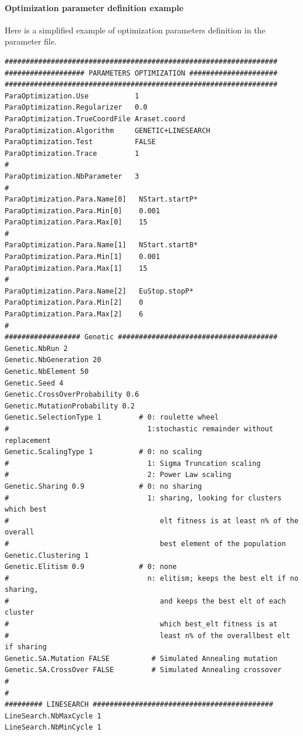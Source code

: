 \documentclass[a4paper,titlepage]{report}
\begin{document}
\paragraph{Optimization parameter definition example}
Here is a simplified example of optimization parameters definition in the parameter file. 
{\scriptsize \begin{verbatim}
#################################################################
################### PARAMETERS OPTIMIZATION #####################
#################################################################
ParaOptimization.Use           1
ParaOptimization.Regularizer   0.0
ParaOptimization.TrueCoordFile Araset.coord
ParaOptimization.Algorithm     GENETIC+LINESEARCH
ParaOptimization.Test          FALSE
ParaOptimization.Trace         1
#
ParaOptimization.NbParameter   3
#
ParaOptimization.Para.Name[0]   NStart.startP*
ParaOptimization.Para.Min[0]    0.001
ParaOptimization.Para.Max[0]    15      
#
ParaOptimization.Para.Name[1]   NStart.startB*
ParaOptimization.Para.Min[1]    0.001
ParaOptimization.Para.Max[1]    15      
#
ParaOptimization.Para.Name[2]   EuStop.stopP*
ParaOptimization.Para.Min[2]    0
ParaOptimization.Para.Max[2]    6       
#
################## Genetic ######################################
Genetic.NbRun 2
Genetic.NbGeneration 20
Genetic.NbElement 50
Genetic.Seed 4
Genetic.CrossOverProbability 0.6
Genetic.MutationProbability 0.2
Genetic.SelectionType 1         # 0: roulette wheel 
#                                 1:stochastic remainder without replacement
Genetic.ScalingType 1           # 0: no scaling 
#                                 1: Sigma Truncation scaling 
#                                 2: Power Law scaling
Genetic.Sharing 0.9             # 0: no sharing 
#                                 1: sharing, looking for clusters which best 
#                                    elt fitness is at least n% of the overall 
#                                    best element of the population
Genetic.Clustering 1
Genetic.Elitism 0.9             # 0: none
#                                 n: elitism; keeps the best elt if no sharing,
#                                    and keeps the best elt of each cluster 
#                                    which best_elt fitness is at
#                                    least n% of the overallbest elt if sharing 
Genetic.SA.Mutation FALSE          # Simulated Annealing mutation
Genetic.SA.CrossOver FALSE         # Simulated Annealing crossover
#
#
######### LINESEARCH ###########################################
LineSearch.NbMaxCycle 1
LineSearch.NbMinCycle 1

\end{verbatim}}
\end{document}
